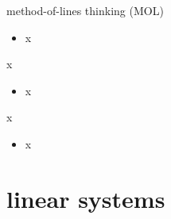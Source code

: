 \documentclass[10pt,hyperref]{beamer}
\begin{document}
\begin{frame}{method-of-lines thinking (MOL)}

\begin{itemize}
\item x
\end{itemize}
\end{frame}


\begin{frame}{x}

\begin{itemize}
\item x
\end{itemize}
\end{frame}


\begin{frame}{x}

\begin{itemize}
\item x
\end{itemize}
\end{frame}



\section{linear systems}
\end{document}
